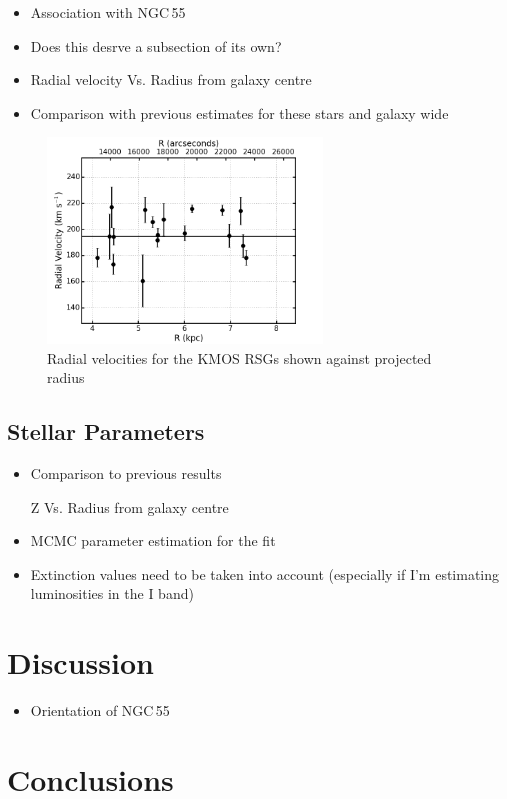 \begin{itemize}
    \item Association with NGC\,55
    \item Does this desrve a subsection of its own?
    \item Radial velocity Vs. Radius from galaxy centre
    \item Comparison with previous estimates for these stars and galaxy wide
\end{itemize}

\begin{figure}
 \centering
 \includegraphics[width=0.65\textwidth]{ngc55/ngc55-RvsRV-F1}
 \caption[Radial velocities for the KMOS RSGs shown against projected radius]{
 Radial velocities for the KMOS RSGs shown against projected radius
         }

 \label{fig:ngc55}
\end{figure}
\subsection{Stellar Parameters} %
\label{sub:stellar_parameters}
\begin{itemize}
    \item Comparison to previous results
    \item [Z] Vs. Radius from galaxy centre
    \item MCMC parameter estimation for the fit
    \item Extinction values need to be taken into account (especially if I'm estimating luminosities in the I band)
    \end{itemize}



\section{Discussion} %
\label{sec:discussion}

\begin{itemize}
    \item Orientation of NGC\,55
\end{itemize}

\section{Conclusions} %
\label{sec:conclusions}


